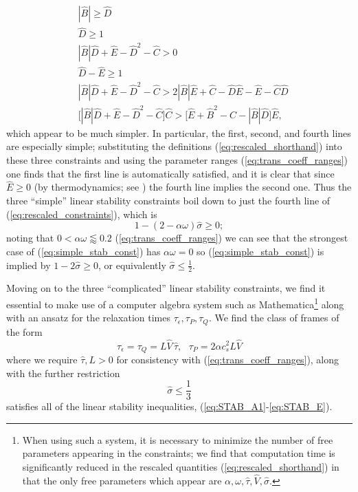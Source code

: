 \documentclass[%
notitlepage,
superscriptaddress,
nofootinbib,
amsmath,
amssymb,
aps,
twocolumn
]{revtex4-1}
\begin{document}
\begin{equation} \label{eq:rescaled_constraints}
\begin{aligned}
&|\hat{B}| \geq \hat{D} \\
&\hat{D} \geq 1 \\
&|\hat{B}| \hat{D} +  \hat{E} - \hat{D}^2 - \hat{C} > 0 \\
&\hat{D} - \hat{E} \geq 1 \\
&|\hat{B}| \hat{D} + \hat{E} - \hat{D}^2 - \hat{C} > 2 |\hat{B}| \hat{E} + \hat{C} - \hat{D} \hat{E} - \hat{E} - \hat{C} \hat{D} \\
&\Big[ |\hat{B}| \hat{D} + \hat{E} - \hat{D}^2 - \hat{C} \Big] \hat{C} > 
\Big[ \hat{E} + \hat{B}^2 - \hat{C} - |\hat{B}| \hat{D} \Big] \hat{E},
\end{aligned}
\end{equation}
which appear to be much simpler.  In particular, the first, second, and fourth lines are especially simple; substituting the definitions (\ref{eq:rescaled_shorthand}) into these three constraints and using the parameter ranges (\ref{eq:trans_coeff_ranges}) one finds that the first line is automatically satisfied, and it is clear that since $\hat{E} \geq 0$ (by thermodynamics; see \cite{Bemfica:2020zjp}) the fourth line implies the second one.  Thus the three ``simple'' linear stability constraints boil down to just the fourth line of (\ref{eq:rescaled_constraints}), which is
\begin{equation} \label{eq:simple_stab_const}
1 - (2 - \alpha \omega) \hat{\sigma} \geq 0;
\end{equation}
noting that $0 < \alpha \omega \lessapprox 0.2$ (\ref{eq:trans_coeff_ranges}) we can see that the strongest case of (\ref{eq:simple_stab_const}) has $\alpha \omega = 0$ so (\ref{eq:simple_stab_const}) is implied by $1 - 2 \hat{\sigma} \geq 0$, or equivalently $\hat{\sigma} \leq \frac{1}{2}$.

Moving on to the three ``complicated'' linear stability constraints, we find it essential to make use of a computer algebra system such as Mathematica\footnote{When using such a system, it is necessary to minimize the number of free parameters appearing in the constraints; we find that computation time is significantly reduced in the rescaled quantities (\ref{eq:rescaled_shorthand}) in that the only free parameters which appear are $\alpha, \omega, \hat{\tau}, \hat{V}, \hat{\sigma}$.} along with an ansatz for the relaxation times $\tau_{\epsilon}, \tau_{P}, \tau_{Q}$.  We find the class of frames of the form
\begin{equation} \label{eq:frame_ansatz}
\tau_{\epsilon} = \tau_{Q} = L \hat{V} \, \hat{\tau}, ~~~ \tau_{P} = 2 \alpha c_s^2 L \hat{V}
\end{equation}
where we require $\hat{\tau}, L > 0$ for consistency with (\ref{eq:trans_coeff_ranges}), along with the further restriction
\begin{equation} \label{eq:sigma_bound}
\hat{\sigma} \leq \frac{1}{3}
\end{equation}
satisfies all of the linear stability inequalities, (\ref{eq:STAB_A1}-\ref{eq:STAB_E}).
\end{document}

